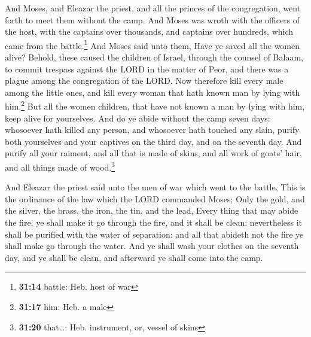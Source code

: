  And Moses, and Eleazar the priest, and all the princes
of the congregation, went forth to meet them without the camp.
 And Moses was wroth with the officers of the host, with
the captains over thousands, and captains over hundreds, which came from
the battle.\footnote{\textbf{31:14} battle: Heb. host of war}
 And Moses said unto them, Have ye saved all the women
alive?  Behold, these caused the children of Israel,
through the counsel of Balaam, to commit trespass against the LORD in
the matter of Peor, and there was a plague among the congregation of the
LORD.  Now therefore kill every male among the little
ones, and kill every woman that hath known man by lying with
him.\footnote{\textbf{31:17} him: Heb. a male}  But all
the women children, that have not known a man by lying with him, keep
alive for yourselves.  And do ye abide without the camp
seven days: whosoever hath killed any person, and whosoever hath touched
any slain, purify both yourselves and your captives on the third day,
and on the seventh day.  And purify all your raiment, and
all that is made of skins, and all work of goats' hair, and all things
made of wood.\footnote{\textbf{31:20} that\ldots: Heb. instrument, or,
  vessel of skins}

 And Eleazar the priest said unto the men of war which
went to the battle, This is the ordinance of the law which the LORD
commanded Moses;  Only the gold, and the silver, the
brass, the iron, the tin, and the lead,  Every thing that
may abide the fire, ye shall make it go through the fire, and it shall
be clean: nevertheless it shall be purified with the water of
separation: and all that abideth not the fire ye shall make go through
the water.  And ye shall wash your clothes on the seventh
day, and ye shall be clean, and afterward ye shall come into the camp.

